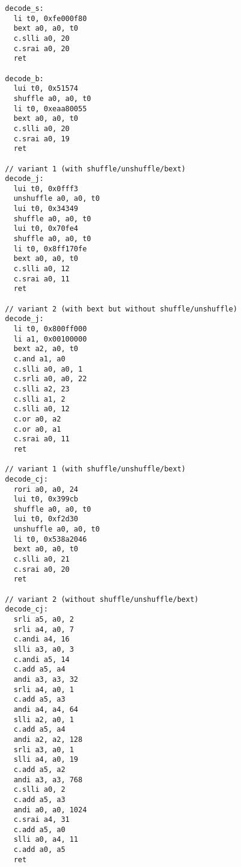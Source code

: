 \begin{verbatim}
  decode_s:
    li t0, 0xfe000f80
    bext a0, a0, t0
    c.slli a0, 20
    c.srai a0, 20
    ret

  decode_b:
    lui t0, 0x51574
    shuffle a0, a0, t0
    li t0, 0xeaa80055
    bext a0, a0, t0
    c.slli a0, 20
    c.srai a0, 19
    ret

  // variant 1 (with shuffle/unshuffle/bext)
  decode_j:
    lui t0, 0x0fff3
    unshuffle a0, a0, t0
    lui t0, 0x34349
    shuffle a0, a0, t0
    lui t0, 0x70fe4
    shuffle a0, a0, t0
    li t0, 0x8ff170fe
    bext a0, a0, t0
    c.slli a0, 12
    c.srai a0, 11
    ret

  // variant 2 (with bext but without shuffle/unshuffle)
  decode_j:
    li t0, 0x800ff000
    li a1, 0x00100000
    bext a2, a0, t0
    c.and a1, a0
    c.slli a0, a0, 1
    c.srli a0, a0, 22
    c.slli a2, 23
    c.slli a1, 2
    c.slli a0, 12
    c.or a0, a2
    c.or a0, a1
    c.srai a0, 11
    ret

  // variant 1 (with shuffle/unshuffle/bext)
  decode_cj:
    rori a0, a0, 24
    lui t0, 0x399cb
    shuffle a0, a0, t0
    lui t0, 0xf2d30
    unshuffle a0, a0, t0
    li t0, 0x538a2046
    bext a0, a0, t0
    c.slli a0, 21
    c.srai a0, 20
    ret

  // variant 2 (without shuffle/unshuffle/bext)
  decode_cj:
    srli a5, a0, 2
    srli a4, a0, 7
    c.andi a4, 16
    slli a3, a0, 3
    c.andi a5, 14
    c.add a5, a4
    andi a3, a3, 32
    srli a4, a0, 1
    c.add a5, a3
    andi a4, a4, 64
    slli a2, a0, 1
    c.add a5, a4
    andi a2, a2, 128
    srli a3, a0, 1
    slli a4, a0, 19
    c.add a5, a2
    andi a3, a3, 768
    c.slli a0, 2
    c.add a5, a3
    andi a0, a0, 1024
    c.srai a4, 31
    c.add a5, a0
    slli a0, a4, 11
    c.add a0, a5
    ret
\end{verbatim}

